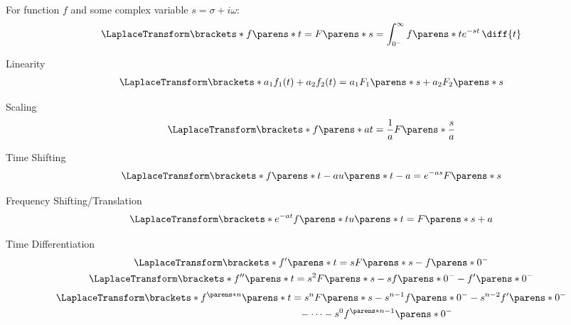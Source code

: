 \begin{multicols}{2}
    
    \begin{CheatsheetEntryFrameStart}


        For function $f$ and some complex variable $s = \sigma + i \omega$:
        \begin{gather*}
            \LaplaceTransform\brackets*{f\parens*{t}}
            = F\parens*{s}
            = \int_{0^-}^\infty f\parens*{t} e^{-s t} \,\diff{t}
        \end{gather*}

        \begin{center}
            Linearity
            \begin{gather*}
                \LaplaceTransform\brackets*{a_1 f_1(t) + a_2 f_2(t)}
                = a_1 F_1\parens*{s} + a_2 F_2\parens*{s}
            \end{gather*}

            Scaling
            \begin{gather*}
                \LaplaceTransform\brackets*{f\parens*{a t}}
                = \frac{1}{a} F\parens*{\frac{s}{a}}
            \end{gather*}

            Time Shifting
            \begin{gather*}
                \LaplaceTransform\brackets*{f\parens*{t - a} u\parens*{t - a}}
                = e^{-a s} F\parens*{s}
            \end{gather*}

            Frequency Shifting/Translation
            \begin{gather*}
                \LaplaceTransform\brackets*{e^{-a t} f\parens*{t} u\parens*{t}}
                = F\parens*{s + a}
            \end{gather*}

            Time Differentiation
            \begin{gather*}
                \LaplaceTransform\brackets*{f'\parens*{t}}
                = s F\parens*{s} - f\parens*{0^-}
                \\
                \LaplaceTransform\brackets*{f''\parens*{t}}
                = s^2 F\parens*{s} - s f\parens*{0^-} - f'\parens*{0^-}
            \end{gather*}
            \begin{align*}
                \LaplaceTransform\brackets*{f^{\parens*{n}}\parens*{t}}
                &= s^n F\parens*{s}
                - s^{n-1} f\parens*{0^-}
                - s^{n-2} f'\parens*{0^-}
                \\
                &\phantom{=} - \cdots
                - s^0 f^{\parens*{n-1}}\parens*{0^-}
            \end{align*}


\end{center}
\end{CheatsheetEntryFrameStart}
\end{multicols}
